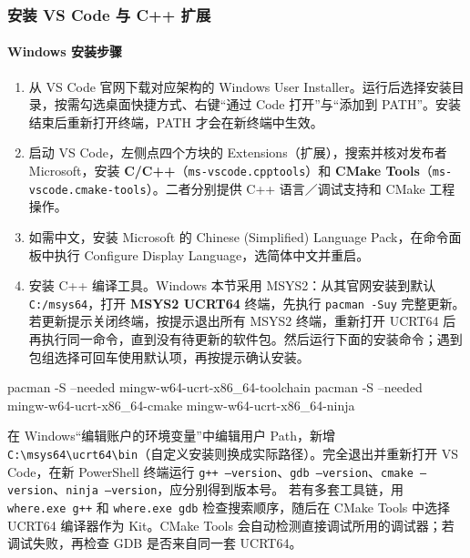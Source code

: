 \subsubsection{安装 VS Code 与 C++ 扩展}
\paragraph*{Windows 安装步骤}
\begin{enumerate}
\item 从 VS Code 官网下载对应架构的 Windows User Installer。运行后选择安装目录，按需勾选桌面快捷方式、右键“通过 Code 打开”与“添加到 PATH”。安装结束后重新打开终端，PATH 才会在新终端中生效。
\item 启动 VS Code，左侧点四个方块的 Extensions（扩展），搜索并核对发布者 Microsoft，安装 \textbf{C/C++}（\texttt{ms-vscode.cpptools}）和 \textbf{CMake Tools}（\texttt{ms-vscode.cmake-tools}）。二者分别提供 C++ 语言／调试支持和 CMake 工程操作。
\item 如需中文，安装 Microsoft 的 Chinese (Simplified) Language Pack，在命令面板中执行 Configure Display Language，选简体中文并重启。
\item 安装 C++ 编译工具。Windows 本节采用 MSYS2：从其官网安装到默认 \texttt{C:/msys64}，打开 \textbf{MSYS2 UCRT64} 终端，先执行 \texttt{pacman -Suy} 完整更新。若更新提示关闭终端，按提示退出所有 MSYS2 终端，重新打开 UCRT64 后再执行同一命令，直到没有待更新的软件包。然后运行下面的安装命令；遇到包组选择可回车使用默认项，再按提示确认安装。
\end{enumerate}


\begin{tbash}
pacman -S --needed mingw-w64-ucrt-x86_64-toolchain
pacman -S --needed mingw-w64-ucrt-x86_64-cmake mingw-w64-ucrt-x86_64-ninja
\end{tbash}


在 Windows“编辑账户的环境变量”中编辑用户 Path，新增 \texttt{C:\textbackslash msys64\textbackslash ucrt64\textbackslash bin}（自定义安装则换成实际路径）。完全退出并重新打开 VS Code，在新 PowerShell 终端运行 \texttt{g++ --version}、\texttt{gdb --version}、\texttt{cmake --version}、\texttt{ninja --version}，应分别得到版本号。
若有多套工具链，用 \texttt{where.exe g++} 和 \texttt{where.exe gdb} 检查搜索顺序，随后在 CMake Tools 中选择 UCRT64 编译器作为 Kit。CMake Tools 会自动检测直接调试所用的调试器；若调试失败，再检查 GDB 是否来自同一套 UCRT64。

